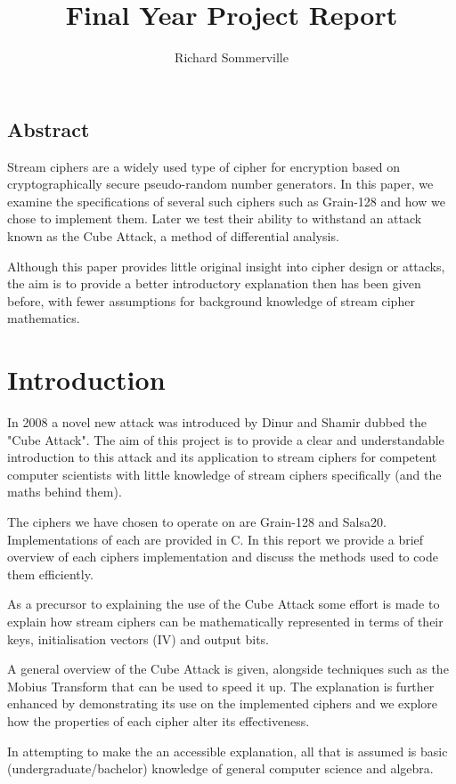\documentclass{report}
\title{Final Year Project Report}
\author{Richard Sommerville}
\date{}
\begin{document}
\maketitle
\tableofcontents
\section{Abstract}
Stream ciphers are a widely used type of cipher for encryption based on cryptographically secure pseudo-random number generators. In this paper, we examine the specifications of several such ciphers such as Grain-128 and how we chose to implement them. Later we test their ability to withstand an attack known as the Cube Attack, a method of differential analysis.

Although this paper provides little original insight into cipher design or attacks, the aim is to provide a better introductory explanation then has been given before, with fewer assumptions for background knowledge of stream cipher mathematics.
\chapter{Introduction}
In 2008 a novel new attack was introduced by Dinur and Shamir\cite{DinurShamir2009} dubbed the "Cube Attack". The aim of this project is
to provide a clear and understandable introduction to this attack and its application to stream ciphers for competent computer scientists with little knowledge of stream ciphers specifically (and the maths behind them).

The ciphers we have chosen to operate on are Grain-128 and Salsa20. Implementations of each are provided in C.
In this report we provide a brief overview of each ciphers implementation and discuss the methods used to code them efficiently.

As a precursor to explaining the use of the Cube Attack some effort is made to explain how stream ciphers can be mathematically represented in terms of their keys, initialisation vectors (IV) and output bits.

A general overview of the Cube Attack is given, alongside techniques such as the Mobius Transform that can be used to speed it up. The explanation is further enhanced by demonstrating its use on the implemented ciphers and we explore how the properties of each cipher alter its effectiveness.

In attempting to make the an accessible explanation, all that is assumed is basic (undergraduate/bachelor) knowledge of general computer science and algebra.
\end{document}
